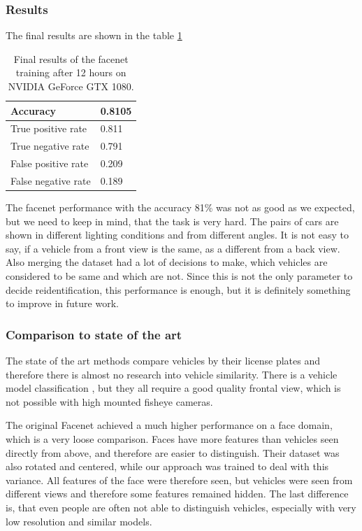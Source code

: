 \documentclass[a4paper,11pt,titlepage,twoside]{article}
\numberwithin{figure}{section}
\begin{document}
\subsubsection{Results}

The final results are shown in the table \ref{tab:facenet}


\begin{table}[H]
\centering
\begin{tabular}{|l|l|}
  \hline
  Accuracy & 0.8105 \\
  \hline
  True positive rate & 0.811 \\
  \hline
  True negative rate & 0.791 \\
  \hline
  False positive rate & 0.209 \\
  \hline
  False negative rate & 0.189 \\
  \hline
\end{tabular}
\caption{Final results of the facenet training after 12 hours on NVIDIA GeForce GTX 1080.}
\label{tab:facenet}
\end{table}

The facenet performance with the accuracy 81\% was not as good as we expected, but we need to keep in mind, that the task is very hard. The pairs of cars are shown in different lighting conditions and from different angles. It is not easy to say, if a vehicle from a front view is the same, as a different from a back view. Also merging the dataset had a lot of decisions to make, which vehicles are considered to be same and which are not. Since this is not the only parameter to decide reidentification, this performance is enough, but it is definitely something to improve in future work.

\subsubsection{Comparison to state of the art}
The state of the art methods compare vehicles by their license plates and therefore there is almost no research into vehicle similarity. There is a vehicle model classification \cite{munroe2005multi, psyllos2011vehicle, lai2001vehicle}, but they all require a good quality frontal view, which is not possible with high mounted fisheye cameras.

The original Facenet achieved a much higher performance on a face domain, which is a very loose comparison. Faces have more features than vehicles seen directly from above, and therefore are easier to distinguish.  Their dataset was also rotated and centered, while our approach was trained to deal with this variance. All features of the face were therefore seen, but vehicles were seen from different views and therefore some features remained hidden. The last difference is, that even people are often not able to distinguish vehicles, especially with very low resolution and similar models. 
\end{document}
